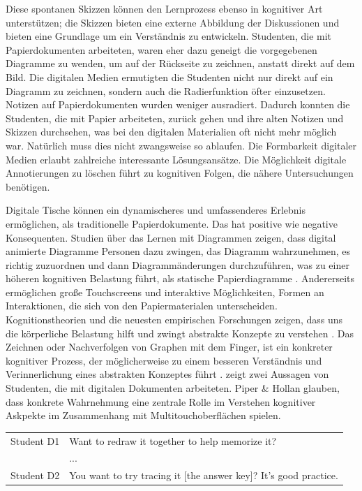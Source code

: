 Diese spontanen Skizzen können den Lernprozess ebenso in kognitiver Art unterstützen; die Skizzen bieten eine externe Abbildung der Diskussionen und bieten eine Grundlage um ein Verständnis zu entwickeln. Studenten, die mit Papierdokumenten arbeiteten, waren eher dazu geneigt die vorgegebenen Diagramme zu wenden, um auf der Rückseite zu zeichnen, anstatt direkt auf dem Bild. Die digitalen Medien ermutigten die Studenten nicht nur direkt auf ein Diagramm zu zeichnen, sondern auch die Radierfunktion öfter einzusetzen. Notizen auf Papierdokumenten wurden weniger ausradiert. Dadurch konnten die Studenten, die mit Papier arbeiteten, zurück gehen und ihre alten Notizen und Skizzen durchsehen, was bei den digitalen Materialien oft nicht mehr möglich war. Natürlich muss dies nicht zwangsweise so ablaufen. Die Formbarkeit digitaler Medien erlaubt zahlreiche interessante Lösungsansätze. Die Möglichkeit digitale Annotierungen zu löschen führt zu kognitiven Folgen, die nähere Untersuchungen benötigen.

\medskip Digitale Tische können ein dynamischeres und umfassenderes Erlebnis ermöglichen, als traditionelle Papierdokumente. Das hat positive wie negative Konsequenten. Studien über das Lernen mit Diagrammen zeigen, dass digital animierte Diagramme Personen dazu zwingen, das Diagramm wahrzunehmen, es richtig zuzuordnen und dann Diagrammänderungen durchzuführen, was zu einer höheren kognitiven Belastung führt, als statische Papierdiagramme \citep{Price:2002}. Andererseits ermöglichen große Touchscreens und interaktive Möglichkeiten, Formen an Interaktionen, die sich von den Papiermaterialen unterscheiden. Kognitionstheorien und die neuesten empirischen Forschungen zeigen, dass uns die körperliche Belastung hilft und zwingt abstrakte Konzepte zu verstehen \citep{Clark:1996,Johnson:1987,Nunez:1999,Varela:1991}. Das Zeichnen oder Nachverfolgen von Graphen mit dem Finger, ist ein konkreter kognitiver Prozess, der möglicherweise zu einem besseren Verständnis und Verinnerlichung eines abstrakten Konzeptes führt \citep{Goldin:2003}.  zeigt zwei Aussagen von Studenten, die mit digitalen Dokumenten arbeiteten. Piper \& Hollan glauben, dass konkrete Wahrnehmung eine zentrale Rolle im Verstehen kognitiver Askpekte im Zusammenhang mit Multitouchoberflächen spielen. \citep{Piper:2009}

\begin{extract}{
		\myfloatalign
		\begin{tabularx}{\textwidth}{p{2cm}X}
    		Student D1 & Want to redraw it together to help memorize it? \\
			 & ... \\
			Student D2 & You want to try tracing it [the answer key]? It’s good practice. \\
		\end{tabularx}
	}
	\label{ext:piperCognitiveAffordances}
\end{extract}

